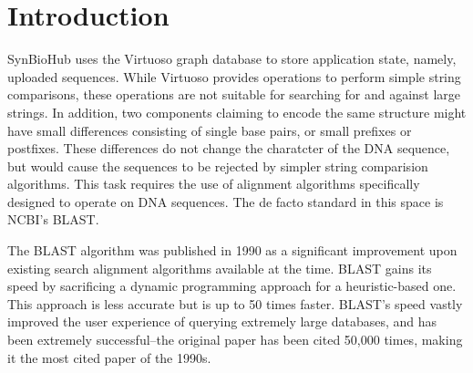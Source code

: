 \documentclass[journal,comsoc]{IEEEtran}
\begin{document}
\section{Introduction}
% 
% 
% 
% 

 

SynBioHub uses the Virtuoso graph database to store application state, namely,
uploaded sequences. While Virtuoso provides operations to perform simple string
comparisons, these operations are not suitable for searching for and against large
strings. In addition, two components claiming to encode the same structure might 
have small differences consisting of single base pairs, or small prefixes or postfixes.
These differences do not change the charatcter of the DNA sequence, but would cause
the sequences to be rejected by simpler string comparision algorithms. This task requires
the use of alignment algorithms specifically designed to operate on DNA sequences. The
de facto standard in this space is NCBI's BLAST.

The BLAST algorithm was published in 1990 as a significant improvement upon existing search
alignment algorithms available at the time. BLAST gains its speed by sacrificing a dynamic
programming approach for a heuristic-based one. This approach is less accurate but is up to 50
times faster. BLAST's speed vastly improved the user experience of querying extremely large
databases, and has been extremely successful--the original paper has been cited 50,000 times,
making it the most cited paper of the 1990s.

\end{document}
